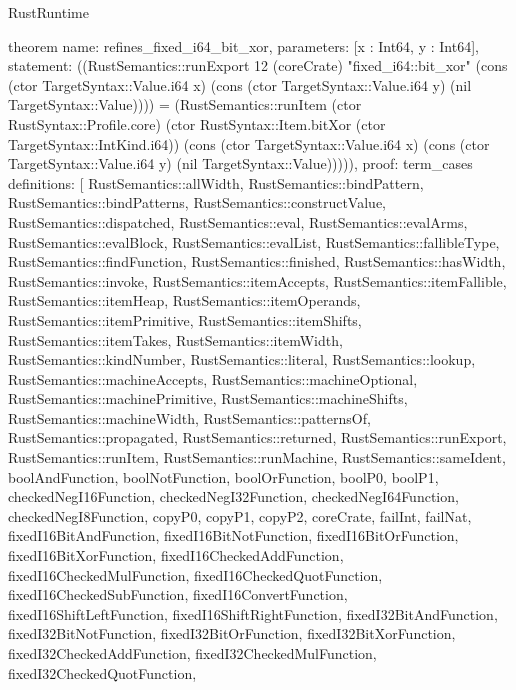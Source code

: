 \begin{lexlean}{RustRuntime}
\begin{semanticmodule}
theorem{
  name: refines_fixed_i64_bit_xor,
  parameters: [x : Int64, y : Int64],
  statement: ((RustSemantics::runExport 12 (coreCrate) "fixed_i64::bit_xor" (cons (ctor TargetSyntax::Value.i64 x) (cons (ctor TargetSyntax::Value.i64 y) (nil TargetSyntax::Value)))) = (RustSemantics::runItem (ctor RustSyntax::Profile.core) (ctor RustSyntax::Item.bitXor (ctor TargetSyntax::IntKind.i64)) (cons (ctor TargetSyntax::Value.i64 x) (cons (ctor TargetSyntax::Value.i64 y) (nil TargetSyntax::Value))))),
  proof: term_cases{
    definitions: [
      RustSemantics::allWidth,
      RustSemantics::bindPattern,
      RustSemantics::bindPatterns,
      RustSemantics::constructValue,
      RustSemantics::dispatched,
      RustSemantics::eval,
      RustSemantics::evalArms,
      RustSemantics::evalBlock,
      RustSemantics::evalList,
      RustSemantics::fallibleType,
      RustSemantics::findFunction,
      RustSemantics::finished,
      RustSemantics::hasWidth,
      RustSemantics::invoke,
      RustSemantics::itemAccepts,
      RustSemantics::itemFallible,
      RustSemantics::itemHeap,
      RustSemantics::itemOperands,
      RustSemantics::itemPrimitive,
      RustSemantics::itemShifts,
      RustSemantics::itemTakes,
      RustSemantics::itemWidth,
      RustSemantics::kindNumber,
      RustSemantics::literal,
      RustSemantics::lookup,
      RustSemantics::machineAccepts,
      RustSemantics::machineOptional,
      RustSemantics::machinePrimitive,
      RustSemantics::machineShifts,
      RustSemantics::machineWidth,
      RustSemantics::patternsOf,
      RustSemantics::propagated,
      RustSemantics::returned,
      RustSemantics::runExport,
      RustSemantics::runItem,
      RustSemantics::runMachine,
      RustSemantics::sameIdent,
      boolAndFunction,
      boolNotFunction,
      boolOrFunction,
      boolP0,
      boolP1,
      checkedNegI16Function,
      checkedNegI32Function,
      checkedNegI64Function,
      checkedNegI8Function,
      copyP0,
      copyP1,
      copyP2,
      coreCrate,
      failInt,
      failNat,
      fixedI16BitAndFunction,
      fixedI16BitNotFunction,
      fixedI16BitOrFunction,
      fixedI16BitXorFunction,
      fixedI16CheckedAddFunction,
      fixedI16CheckedMulFunction,
      fixedI16CheckedQuotFunction,
      fixedI16CheckedSubFunction,
      fixedI16ConvertFunction,
      fixedI16ShiftLeftFunction,
      fixedI16ShiftRightFunction,
      fixedI32BitAndFunction,
      fixedI32BitNotFunction,
      fixedI32BitOrFunction,
      fixedI32BitXorFunction,
      fixedI32CheckedAddFunction,
      fixedI32CheckedMulFunction,
      fixedI32CheckedQuotFunction,
}}
\end{semanticmodule}
\end{lexlean}
